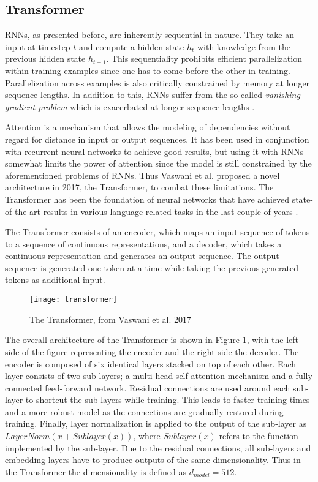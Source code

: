 \subsection{Transformer} \label{Transformer}
RNNs, as presented before, are inherently sequential in nature.
They take an input at timestep $t$ and compute a hidden state $h_t$ with knowledge from the previous hidden state $h_{t-1}$.
This sequentiality prohibits efficient parallelization within training examples since one has to come before the other in training.
Parallelization across examples is also critically constrained by memory at longer sequence lengths.
In addition to this, RNNs suffer from the so-called \textit{vanishing gradient problem} which is exacerbated at longer sequence lengths \cite{vaswani2017}.

Attention is a mechanism that allows the modeling of dependencies without regard for distance in input or output sequences.
It has been used in conjunction with recurrent neural networks to achieve good results, but using it with RNNs somewhat limits the power of attention since the model is still constrained by the aforementioned problems of RNNs.
Thus Vaswani et al. proposed a novel architecture in 2017, the Transformer, to combat these limitations.
The Transformer has been the foundation of neural networks that have achieved state-of-the-art results in various language-related tasks in the last couple of years \cite{vaswani2017}.

The Transformer consists of an encoder, which maps an input sequence of tokens to a sequence of continuous representations, and a decoder, which takes a continuous representation and generates an output sequence.
The output sequence is generated one token at a time while taking the previous generated tokens as additional input.

\begin{figure}[t]
\texttt{[image: transformer]}
\centering
\caption{The Transformer, from Vaswani et al. 2017 \cite{vaswani2017}}
\label{fig:transformer}
\end{figure}

The overall architecture of the Transformer is shown in Figure \ref{fig:transformer}, with the left side of the figure representing the encoder and the right side the decoder.
The encoder is composed of six identical layers stacked on top of each other.
Each layer consists of two sub-layers; a multi-head self-attention mechanism and a fully connected feed-forward network.
Residual connections \cite{he2016} are used around each sub-layer to shortcut the sub-layers while training.
This leads to faster training times and a more robust model as the connections are gradually restored during training.
Finally, layer normalization is applied to the output of the sub-layer as $LayerNorm(x+Sublayer(x))$, where $Sublayer(x)$ refers to the function implemented by the sub-layer.
Due to the residual connections, all sub-layers and embedding layers have to produce outputs of the same dimensionality.
Thus in the Transformer the dimensionality is defined as $d_{model}=512$.

